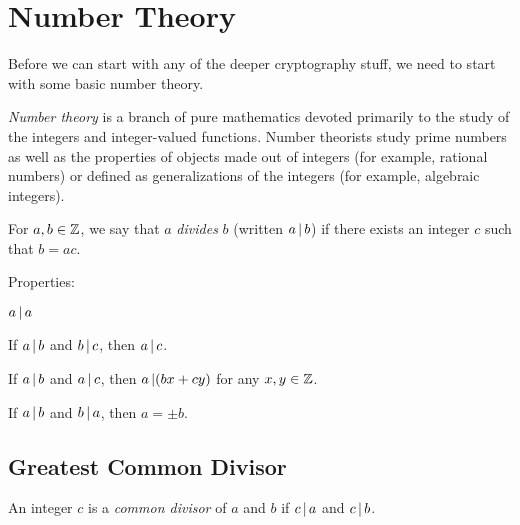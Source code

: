 \section{Number Theory}\label{sec:Number_Theory}
Before we can start with any of the deeper cryptography stuff, we need to start with some basic number theory.
\begin{definition}\label{def:Number_Theory}
  \emph{Number theory} is a branch of pure mathematics devoted primarily to the study of the integers and integer-valued functions.
  Number theorists study prime numbers as well as the properties of objects made out of integers (for example, rational numbers) or defined as generalizations of the integers (for example, algebraic integers).
\end{definition}

\begin{definition}[Divides]\label{def:Divides}
  For $a, b \in \operatorname{\mathbb{Z}}$, we say that $a$ \emph{divides} $b$ (written $a \operatorname{\vert} b$) if there exists an integer $c$ such that $b = ac$.

  Properties:
  \begin{propertylist}
  \item $a \operatorname{\vert} a$
  \item If $a \operatorname{\vert} b$ and $b \operatorname{\vert} c$, then $a \operatorname{\vert} c$.
  \item If $a \operatorname{\vert} b$ and $a \operatorname{\vert} c$, then $a \operatorname{\vert} (bx + cy)$ for any $x, y \in \operatorname{\mathbb{Z}}$.
  \item If $a \operatorname{\vert} b$ and $b \operatorname{\vert} a$, then $a = \pm b$.
  \end{propertylist}
\end{definition}



\subsection{Greatest Common Divisor}\label{subsec:Greatest_Common_Divisor}
\begin{definition}\label{def:Common_Divisor}
  An integer $c$ is a \emph{common divisor} of $a$ and $b$ if $c \operatorname{\vert} a$ and $c \operatorname{\vert} b$.
\end{definition}

